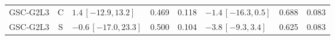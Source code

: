 \begin{longtable}{lcp{37mm}rrp{37mm}rr}
GSC-G2L3 & C & \(1.4\,[-12.9,13.2]\) & 0.469 & 0.118 & \(-1.4\,[-16.3,0.5]\) & 0.688 & 0.083\\
GSC-G2L3 & S & \(-0.6\,[-17.0,23.3]\) & 0.500 & 0.104 & \(-3.8\,[-9.3,3.4]\) & 0.625 & 0.083\\

\end{longtable}
